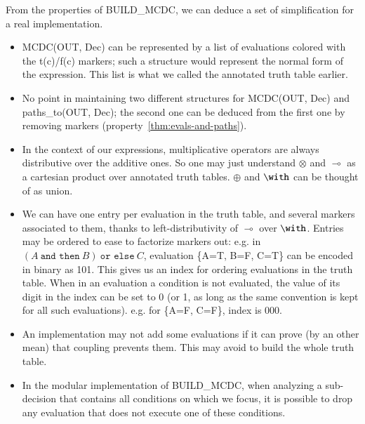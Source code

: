 \documentclass[a4paper,12pt,twoside]{article}
\newcommand{\andthen}{\texttt{and then}}
\newcommand{\orelse}{\texttt{or else}}
\begin{document}
From the properties of BUILD\_MCDC, we can deduce a set of
simplification for a real implementation.

\begin{itemize}
\item MCDC(OUT, Dec) can be represented by a list of evaluations
colored with the t(c)/f(c) markers; such a structure would represent
the normal form of the expression. This list is what we called the
annotated truth table earlier.

\item No point in maintaining two different structures for MCDC(OUT, Dec) and
paths\_to(OUT, Dec); the second one can be deduced from the first one by
removing markers (property~\ref{thm:evals-and-paths}).
 
\item In the context of our expressions, multiplicative operators are
always distributive over the additive ones. So one may just understand
$\otimes$ and $\multimap$ as a cartesian product over annotated truth tables.
$\oplus$ and $\with$ can be thought of as union.
 
\item We can have one entry per evaluation in the truth table, and several
markers associated to them, thanks to left-distributivity of $\multimap$ over
$\with$. Entries may be ordered to ease to factorize markers out:
e.g. in $(A \ \andthen{} \ B) \ \orelse{} \ C$, evaluation \{A=T, B=F, C=T\}
can be encoded in binary as 101. This gives us an index for ordering
evaluations in the truth table. When in an evaluation a condition is
not evaluated, the value of its digit in the index can be set to
0 (or 1, as long as the same convention is kept for all such evaluations).
e.g. for \{A=F, C=F\}, index is 000.

\item An implementation may not add some evaluations if it can prove (by
an other mean) that coupling prevents them. This may avoid to build
the whole truth table.
        
\item In the modular implementation of BUILD\_MCDC, when analyzing a
sub-decision that contains all conditions on which we focus, it is
possible to drop any evaluation that does not execute one of these
conditions.
\end{itemize}

\newpage


\end{document}
